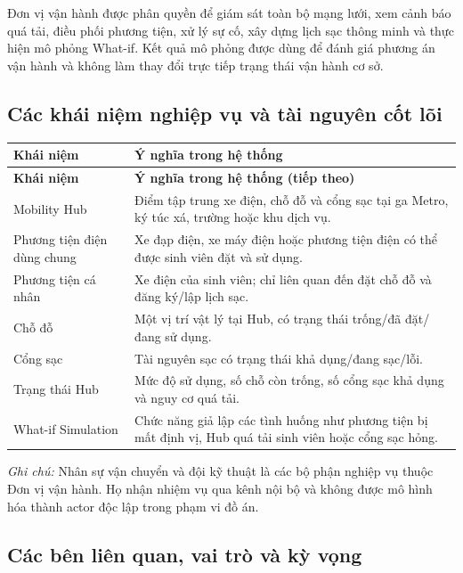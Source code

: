 Đơn vị vận hành được phân quyền để giám sát toàn bộ mạng lưới, xem cảnh báo quá tải, điều phối phương tiện, xử lý sự cố, xây dựng lịch sạc thông minh và thực hiện mô phỏng What-if. Kết quả mô phỏng được dùng để đánh giá phương án vận hành và không làm thay đổi trực tiếp trạng thái vận hành cơ sở.

\subsection{Các khái niệm nghiệp vụ và tài nguyên cốt lõi}

{
\small
\setlength{\tabcolsep}{3pt}
\renewcommand{\arraystretch}{1.25}
\begin{longtable}{|>{\raggedright\arraybackslash}p{4.0cm}|>{\raggedright\arraybackslash}p{8.8cm}|}
\hline
\textbf{Khái niệm} & \textbf{Ý nghĩa trong hệ thống} \\
\hline
\endfirsthead
\hline
\textbf{Khái niệm} & \textbf{Ý nghĩa trong hệ thống (tiếp theo)} \\
\hline
\endhead
Mobility Hub & Điểm tập trung xe điện, chỗ đỗ và cổng sạc tại ga Metro, ký túc xá, trường hoặc khu dịch vụ. \\
\hline
Phương tiện điện dùng chung & Xe đạp điện, xe máy điện hoặc phương tiện điện có thể được sinh viên đặt và sử dụng. \\
\hline
Phương tiện cá nhân & Xe điện của sinh viên; chỉ liên quan đến đặt chỗ đỗ và đăng ký/lập lịch sạc. \\
\hline
Chỗ đỗ & Một vị trí vật lý tại Hub, có trạng thái trống/đã đặt/đang sử dụng. \\
\hline
Cổng sạc & Tài nguyên sạc có trạng thái khả dụng/đang sạc/lỗi. \\
\hline
Trạng thái Hub & Mức độ sử dụng, số chỗ còn trống, số cổng sạc khả dụng và nguy cơ quá tải. \\
\hline
What-if Simulation & Chức năng giả lập các tình huống như phương tiện bị mất định vị, Hub quá tải sinh viên hoặc cổng sạc hỏng. \\
\hline
\end{longtable}
}

\noindent\textit{Ghi chú:} Nhân sự vận chuyển và đội kỹ thuật là các bộ phận nghiệp vụ thuộc Đơn vị vận hành. Họ nhận nhiệm vụ qua kênh nội bộ và không được mô hình hóa thành actor độc lập trong phạm vi đồ án.

\subsection{Các bên liên quan, vai trò và kỳ vọng}

